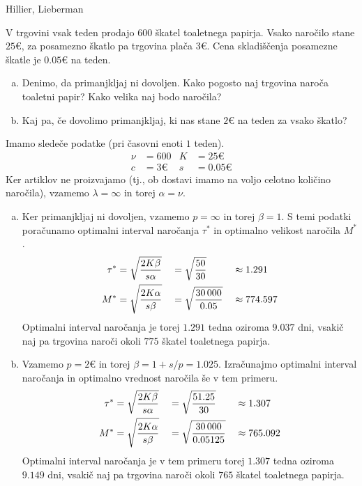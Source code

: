 \begin{naloga}{Hillier, Lieberman}{\cite[Problem~19.3-2]{hl}}
\begin{vprasanje}
V trgovini vsak teden prodajo $600$ škatel toaletnega papirja.
Vsako naročilo stane $25 €$, za posamezno škatlo pa trgovina plača $3 €$.
Cena skladiščenja posamezne škatle je $0.05 €$ na teden.
\begin{enumerate}[(a)]
\item Denimo, da primanjkljaj ni dovoljen.
Kako pogosto naj trgovina naroča toaletni papir?
Kako velika naj bodo naročila?
\item Kaj pa, če dovolimo primanjkljaj,
ki nas stane $2 €$ na teden za vsako škatlo?
\end{enumerate}
\end{vprasanje}

\begin{odgovor}
Imamo sledeče podatke (pri časovni enoti $1$ teden).
\begin{align*}
\nu &= 600 &
K &= 25 € \\
c &= 3 € &
s &= 0.05 €
\end{align*}
Ker artiklov ne proizvajamo
(tj., ob dostavi imamo na voljo celotno količino naročila),
vzamemo $\lambda = \infty$ in torej $\alpha = \nu$.

\begin{enumerate}[(a)]
\item Ker primanjkljaj ni dovoljen, vzamemo $p = \infty$ in torej $\beta = 1$.
S temi podatki poračunamo optimalni interval naročanja $\tau^*$
in optimalno velikost naročila $M^*$.
\begin{alignat*}{3}
\tau^* &= \sqrt{2K \beta \over s \alpha}
&&= \sqrt{50 \over 30} &&\approx 1.291 \\
M^* &= \sqrt{2K \alpha \over s \beta}
&&= \sqrt{30\,000 \over 0.05} &&\approx 774.597
\end{alignat*}
Optimalni interval naročanja je torej $1.291$ tedna oziroma $9.037$ dni,
vsakič naj pa trgovina naroči okoli $775$ škatel toaletnega papirja.

\item Vzamemo $p = 2 €$ in torej $\beta = 1 + s/p = 1.025$.
Izračunajmo optimalni interval naročanja in optimalno vrednost naročila
še v tem primeru.
\begin{alignat*}{3}
\tau^* &= \sqrt{2K \beta \over s \alpha}
&&= \sqrt{51.25 \over 30} &&\approx 1.307 \\
M^* &= \sqrt{2K \alpha \over s \beta}
&&= \sqrt{30\,000 \over 0.05125} &&\approx 765.092
\end{alignat*}
Optimalni interval naročanja je v tem primeru torej $1.307$ tedna
oziroma $9.149$ dni,
vsakič naj pa trgovina naroči okoli $765$ škatel toaletnega papirja.
\end{enumerate}
\end{odgovor}
\end{naloga}

